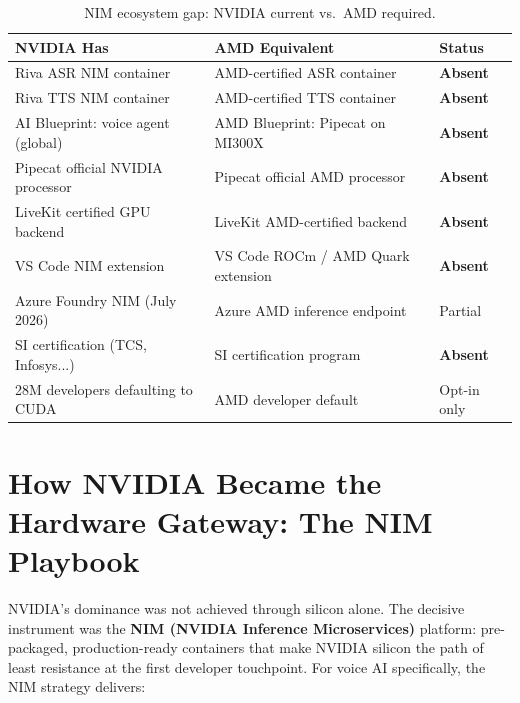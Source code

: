 \documentclass[blind]{gtac}
\begin{document}
\begin{table}[H]
\centering
\caption{NIM ecosystem gap: NVIDIA current vs.\ AMD required.}
\label{tab:nim_gap}
\tiny
\begin{tabular}{@{}lll@{}}
\toprule
NVIDIA Has & AMD Equivalent & Status \\
\midrule
Riva ASR NIM container & AMD-certified ASR container & \textbf{Absent} \\
Riva TTS NIM container & AMD-certified TTS container & \textbf{Absent} \\
AI Blueprint: voice agent (global) & AMD Blueprint: Pipecat on MI300X & \textbf{Absent} \\
Pipecat official NVIDIA processor & Pipecat official AMD processor & \textbf{Absent} \\
LiveKit certified GPU backend & LiveKit AMD-certified backend & \textbf{Absent} \\
VS Code NIM extension & VS Code ROCm / AMD Quark extension & \textbf{Absent} \\
Azure Foundry NIM (July 2026) & Azure AMD inference endpoint & Partial \\
SI certification (TCS, Infosys...) & SI certification program & \textbf{Absent} \\
28M developers defaulting to CUDA & AMD developer default & Opt-in only \\
\bottomrule
\end{tabular}
\end{table}

\section{How NVIDIA Became the Hardware Gateway: The NIM Playbook}
\label{sec:nim}

NVIDIA's dominance was not achieved through silicon alone. The decisive instrument was the \textbf{NIM (NVIDIA Inference Microservices)} platform: pre-packaged, production-ready containers that make NVIDIA silicon the path of least resistance at the first developer touchpoint. For voice AI specifically, the NIM strategy delivers:
\end{document}
